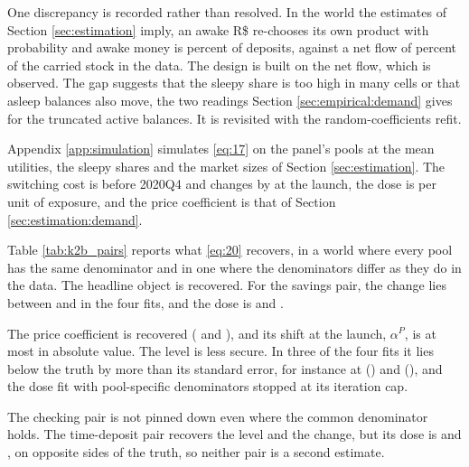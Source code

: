 One discrepancy is recorded rather than resolved. In the world the estimates of Section \ref{sec:estimation} imply, an awake R\$ re-chooses its own product with probability  and awake money is  percent of deposits, against a net flow of  percent of the carried stock in the data.
The design is built on the net flow, which is observed. The gap suggests that the sleepy share is too high in many cells or that asleep balances also move, the two readings Section \ref{sec:empirical:demand} gives for the truncated active balances. It is revisited with the random-coefficients refit.

Appendix \ref{app:simulation} simulates \eqref{eq:17} on the panel's pools at the mean utilities, the sleepy shares and the market sizes of Section \ref{sec:estimation}. The switching cost is  before 2020Q4 and changes by  at the launch, the dose is  per unit of exposure, and the price coefficient is that of Section \ref{sec:estimation:demand}.

Table \ref{tab:k2b_pairs} reports what \eqref{eq:20} recovers, in a world where every pool has the same denominator and in one where the denominators differ as they do in the data. The headline object is recovered. For the savings pair, the change lies between  and  in the four fits, and the dose is  and .

The price coefficient is recovered ( and ), and its shift at the launch, $\alpha^{P}$, is at most  in absolute value.
The level is less secure. In three of the four fits it lies below the truth by more than its standard error, for instance at  () and  (), and the dose fit with pool-specific denominators stopped at its iteration cap.

The checking pair is not pinned down even where the common denominator holds. The time-deposit pair recovers the level and the change, but its dose is  and , on opposite sides of the truth, so neither pair is a second estimate.

